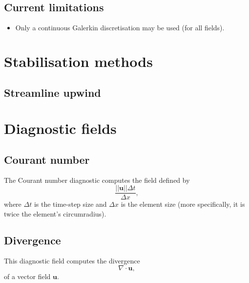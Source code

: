 \documentclass[a4paper,11pt]{report}
\begin{document}
\section{Current limitations}
\begin{itemize}
   \item Only a continuous Galerkin discretisation may be used (for all fields).
\end{itemize}

\chapter{Stabilisation methods}

\section{Streamline upwind}


\chapter{Diagnostic fields}

\section{Courant number}
The Courant number diagnostic computes the field defined by
\begin{equation}
   \frac{||\mathbf{u}||\Delta t}{\Delta x},
\end{equation}
where $\Delta t$ is the time-step size and $\Delta x$ is the element size (more specifically, it is twice the element's circumradius).

\section{Divergence}
This diagnostic field computes the divergence
\begin{equation}
   \nabla\cdot\mathbf{u},
\end{equation}
of a vector field $\mathbf{u}$.
\end{document}
